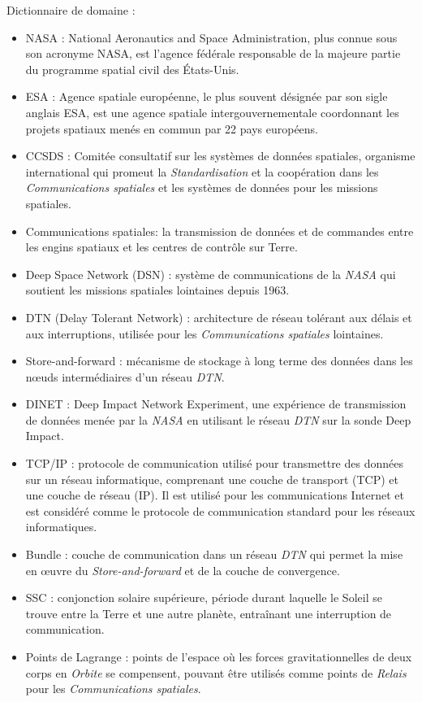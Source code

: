 \documentclass[conference]{IEEEtran}
\begin{document}
\appendix
Dictionnaire de domaine :
\begin{itemize}
\item NASA : National Aeronautics and Space Administration, plus connue sous son acronyme NASA, est l'agence fédérale responsable de la majeure partie du programme spatial civil des États-Unis.
\item ESA : Agence spatiale européenne, le plus souvent désignée par son sigle anglais ESA, est une agence spatiale intergouvernementale coordonnant les projets spatiaux menés en commun par 22 pays européens.
\item CCSDS : Comitée consultatif sur les systèmes de données spatiales, organisme international qui promeut la \emph{Standardisation} et la coopération dans les \emph{Communications spatiales} et les systèmes de données pour les missions spatiales.
\item Communications spatiales: la transmission de données et de commandes entre les engins spatiaux et les centres de contrôle sur Terre.
\item Deep Space Network (DSN) : système de communications de la \emph{NASA} qui soutient les missions spatiales lointaines depuis 1963.
\item DTN (Delay Tolerant Network) : architecture de réseau tolérant aux délais et aux interruptions, utilisée pour les \emph{Communications spatiales} lointaines.
\item Store-and-forward : mécanisme de stockage à long terme des données dans les nœuds intermédiaires d'un réseau \emph{DTN}.
\item DINET : Deep Impact Network Experiment, une expérience de transmission de données menée par la \emph{NASA} en utilisant le réseau \emph{DTN} sur la sonde Deep Impact.
\item TCP/IP : protocole de communication utilisé pour transmettre des données sur un réseau informatique, comprenant une couche de transport (TCP) et une couche de réseau (IP). Il est utilisé pour les communications Internet et est considéré comme le protocole de communication standard pour les réseaux informatiques.
\item Bundle : couche de communication dans un réseau \emph{DTN} qui permet la mise en œuvre du \emph{Store-and-forward} et de la couche de convergence.
\item SSC : conjonction solaire supérieure, période durant laquelle le Soleil se trouve entre la Terre et une autre planète, entraînant une interruption de communication.
\item Points de Lagrange : points de l'espace où les forces gravitationnelles de deux corps en \emph{Orbite} se compensent, pouvant être utilisés comme points de \emph{Relais} pour les \emph{Communications spatiales}.

\end{itemize}
\end{document}
